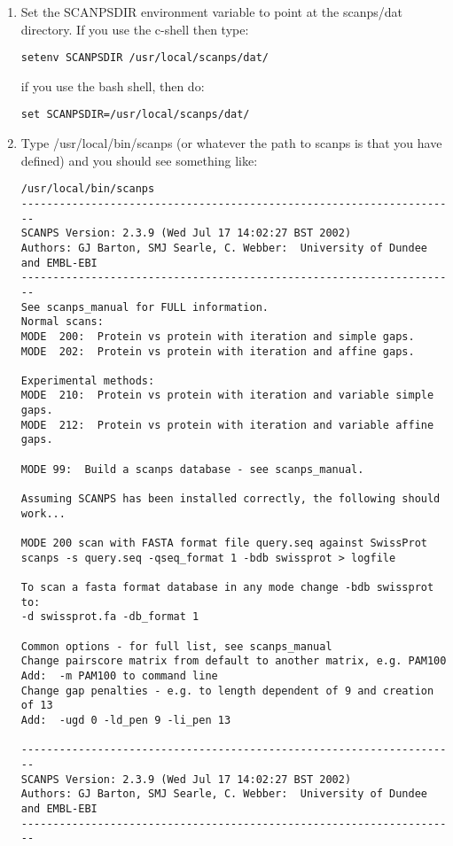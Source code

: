 \documentclass[12pt]{article}
\begin{document}
\begin{enumerate}
\item Set the SCANPSDIR environment variable to point at the
scanps/dat directory.  If you use the c-shell then type:

\begin{verbatim}
setenv SCANPSDIR /usr/local/scanps/dat/
\end{verbatim}

if you use the bash shell, then do:

\begin{verbatim}
set SCANPSDIR=/usr/local/scanps/dat/
\end{verbatim}

\item Type /usr/local/bin/scanps (or whatever the path to scanps is
that you have defined) and you should see something like:

\begin{scriptsize}
\begin{verbatim}
/usr/local/bin/scanps
---------------------------------------------------------------------
SCANPS Version: 2.3.9 (Wed Jul 17 14:02:27 BST 2002)
Authors: GJ Barton, SMJ Searle, C. Webber:  University of Dundee and EMBL-EBI
---------------------------------------------------------------------
See scanps_manual for FULL information.
Normal scans:
MODE  200:  Protein vs protein with iteration and simple gaps.
MODE  202:  Protein vs protein with iteration and affine gaps.

Experimental methods:
MODE  210:  Protein vs protein with iteration and variable simple gaps.
MODE  212:  Protein vs protein with iteration and variable affine gaps.

MODE 99:  Build a scanps database - see scanps_manual.

Assuming SCANPS has been installed correctly, the following should work...

MODE 200 scan with FASTA format file query.seq against SwissProt
scanps -s query.seq -qseq_format 1 -bdb swissprot > logfile

To scan a fasta format database in any mode change -bdb swissprot to:
-d swissprot.fa -db_format 1

Common options - for full list, see scanps_manual
Change pairscore matrix from default to another matrix, e.g. PAM100
Add:  -m PAM100 to command line
Change gap penalties - e.g. to length dependent of 9 and creation of 13 
Add:  -ugd 0 -ld_pen 9 -li_pen 13

---------------------------------------------------------------------
SCANPS Version: 2.3.9 (Wed Jul 17 14:02:27 BST 2002)
Authors: GJ Barton, SMJ Searle, C. Webber:  University of Dundee and EMBL-EBI 
---------------------------------------------------------------------
\end{verbatim}
\end{scriptsize}


\end{enumerate}
\end{document}
